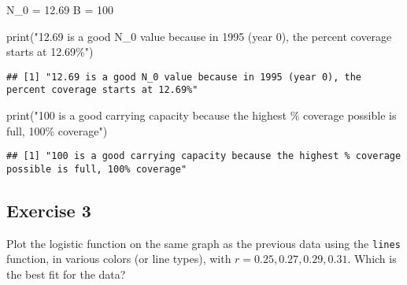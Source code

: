 \documentclass[
]{article}
\newenvironment{Shaded}{\begin{snugshade}}{\end{snugshade}}
\newcommand{\DecValTok}[1]{\textcolor[rgb]{0.00,0.00,0.81}{#1}}
\newcommand{\FloatTok}[1]{\textcolor[rgb]{0.00,0.00,0.81}{#1}}
\newcommand{\FunctionTok}[1]{\textcolor[rgb]{0.00,0.00,0.00}{#1}}
\newcommand{\NormalTok}[1]{#1}
\newcommand{\OtherTok}[1]{\textcolor[rgb]{0.56,0.35,0.01}{#1}}
\newcommand{\StringTok}[1]{\textcolor[rgb]{0.31,0.60,0.02}{#1}}
\begin{document}
\begin{Shaded}
\begin{Highlighting}[]
\NormalTok{N\_0 }\OtherTok{=} \FloatTok{12.69}
\NormalTok{B }\OtherTok{=} \DecValTok{100}

\FunctionTok{print}\NormalTok{(}\StringTok{"12.69 is a good N\_0 value because in 1995 (year 0), the percent coverage starts at 12.69\%"}\NormalTok{)}
\end{Highlighting}
\end{Shaded}

\begin{verbatim}
## [1] "12.69 is a good N_0 value because in 1995 (year 0), the percent coverage starts at 12.69%"
\end{verbatim}

\begin{Shaded}
\begin{Highlighting}[]
\FunctionTok{print}\NormalTok{(}\StringTok{"100 is a good carrying capacity because the highest \% coverage possible is full, 100\% coverage"}\NormalTok{)}
\end{Highlighting}
\end{Shaded}

\begin{verbatim}
## [1] "100 is a good carrying capacity because the highest % coverage possible is full, 100% coverage"
\end{verbatim}

\hypertarget{exercise-3}{%
\subsection{Exercise 3}\label{exercise-3}}

Plot the logistic function on the same graph as the previous data using
the \texttt{lines} function, in various colors (or line types), with
\(r=0.25,0.27,0.29,0.31\). Which is the best fit for the data?
\end{document}
